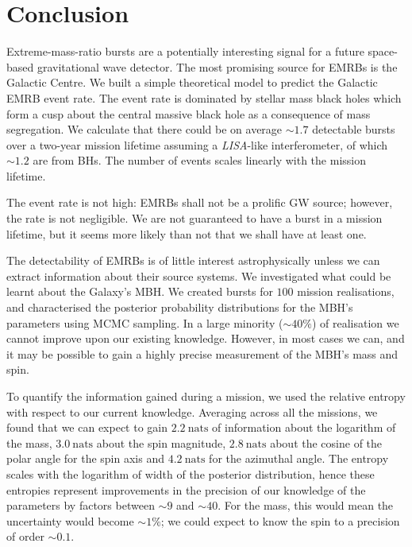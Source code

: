 \documentclass[useAMS,usedcolumn,usegraphicx,usenatbib]{mn2e}
\newcommand{\units}[1]{\ensuremath{~\mathrm{#1}}}
\begin{document}
\section{Conclusion}\label{sec:Gal-End}

Extreme-mass-ratio bursts are a potentially interesting signal for a future space-based gravitational wave detector. The most promising source for EMRBs is the Galactic Centre. We built a simple theoretical model to predict the Galactic EMRB event rate. The event rate is dominated by stellar mass black holes which form a cusp about the central massive black hole as a consequence of mass segregation. We calculate that there could be on average $\sim1.7$ detectable bursts over a two-year mission lifetime assuming a \textit{LISA}-like interferometer, of which $\sim1.2$ are from BHs. The number of events scales linearly with the mission lifetime.

The event rate is not high: EMRBs shall not be a prolific GW source; however, the rate is not negligible. We are not guaranteed to have a burst in a mission lifetime, but it seems more likely than not that we shall have at least one.

The detectability of EMRBs is of little interest astrophysically unless we can extract information about their source systems. We investigated what could be learnt about the Galaxy's MBH. We created bursts for $100$ mission realisations, and characterised the posterior probability distributions for the MBH's parameters using MCMC sampling. In a large minority ($\sim40\%$) of realisation we cannot improve upon our existing knowledge. However, in most cases we can, and it may be possible to gain a highly precise measurement of the MBH's mass and spin.

To quantify the information gained during a mission, we used the relative entropy with respect to our current knowledge. Averaging across all the missions, we found that we can expect to gain $2.2\units{nats}$ of information about the logarithm of the mass, $3.0\units{nats}$ about the spin magnitude, $2.8\units{nats}$ about the cosine of the polar angle for the spin axis and $4.2\units{nats}$ for the azimuthal angle. The entropy scales with the logarithm of width of the posterior distribution, hence these entropies represent improvements in the precision of our knowledge of the parameters by factors between $\sim9$ and $\sim40$. For the mass, this would mean the uncertainty would become $\sim1\%$; we could expect to know the spin to a precision of order $\sim0.1$.
\end{document}
